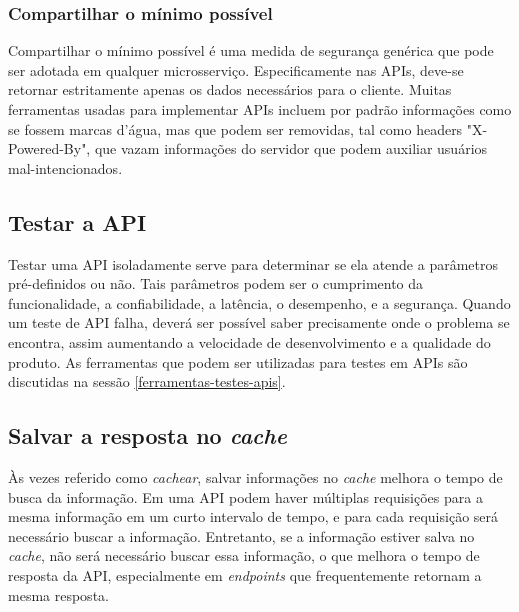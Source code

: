 \subsubsection*{Compartilhar o mínimo possível}
Compartilhar o mínimo possível é uma medida de segurança genérica que pode ser adotada em qualquer microsserviço. Especificamente nas APIs, deve-se retornar estritamente apenas os dados necessários para o cliente. Muitas ferramentas usadas para implementar APIs incluem por padrão informações como se fossem marcas d'água, mas que podem ser removidas, tal como headers "X-Powered-By", que vazam informações do servidor que podem auxiliar usuários mal-intencionados. \cite{rapidAPI-twitter}

\subsection{Testar a API}
Testar uma API isoladamente serve para determinar se ela atende a parâmetros pré-definidos ou não. Tais parâmetros podem ser o cumprimento da funcionalidade, a confiabilidade, a latência, o desempenho, e a segurança. Quando um teste de API falha, deverá ser possível saber precisamente onde o problema se encontra, assim aumentando a velocidade de desenvolvimento e a qualidade do produto. As ferramentas que podem ser utilizadas para testes em APIs são discutidas na sessão \autoref{ferramentas-testes-apis}.


\subsection{Salvar a resposta no \emph{cache}}
Às vezes referido como \emph{cachear}, salvar informações no \emph{cache} melhora o tempo de busca da informação. Em uma API podem haver múltiplas requisições para a mesma informação em um curto intervalo de tempo, e para cada requisição será necessário buscar a informação. Entretanto, se a informação estiver salva no \emph{cache}, não será necessário buscar essa informação, o que melhora o tempo de resposta da API, especialmente em \emph{endpoints} que frequentemente retornam a mesma resposta. \cite{rapidAPI-twitter}

